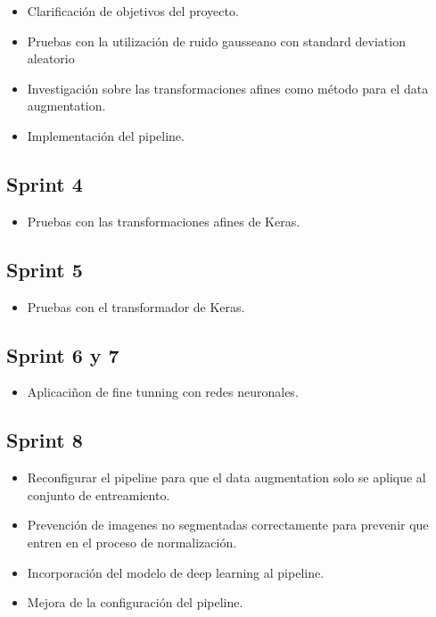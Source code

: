 \begin{itemize}
\item Clarificación de objetivos del proyecto.
\item Pruebas con la utilización de ruido gausseano con standard deviation aleatorio
\item Investigación sobre las transformaciones afines como método para el data augmentation.
\item Implementación del pipeline.
\end{itemize}

\subsection{Sprint 4}

\begin{itemize}
\item Pruebas con las transformaciones afines de Keras.
\end{itemize}

\subsection{Sprint 5}

\begin{itemize}
\item Pruebas con el transformador de Keras.
\end{itemize}

\subsection{Sprint 6 y 7}

\begin{itemize}
\item Aplicaciñon de fine tunning con redes neuronales.
\end{itemize}

\subsection{Sprint 8}

\begin{itemize}
\item Reconfigurar el pipeline para que el data augmentation solo se aplique al conjunto de entreamiento.
\item Prevención de imagenes no segmentadas correctamente para prevenir que entren en el proceso de normalización.
\item Incorporación del modelo de deep learning al pipeline.
\item Mejora de la configuración del pipeline.
\end{itemize}

